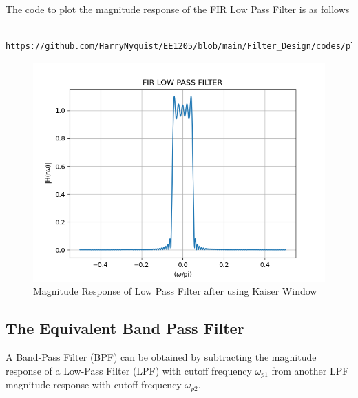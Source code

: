 \documentclass{article}
\begin{document}
The code to plot the magnitude response of the FIR Low Pass Filter is as follows
\begin{lstlisting}
    https://github.com/HarryNyquist/EE1205/blob/main/Filter_Design/codes/plot4.py
\end{lstlisting}
\begin{figure}[H]
\centering
\includegraphics[width=1\columnwidth]{figs/FIR_Low_Filter.png}
\caption{Magnitude Response of Low Pass Filter after using Kaiser Window}
\label{fig:Kaiser_LPF_response}
\end{figure}

\subsection{The Equivalent Band Pass Filter}
A Band-Pass Filter (BPF) can be obtained by subtracting the magnitude response of a Low-Pass Filter (LPF) with cutoff frequency $\omega_{p1}$ from another LPF magnitude response with cutoff frequency $\omega_{p2}$.
\end{document}
